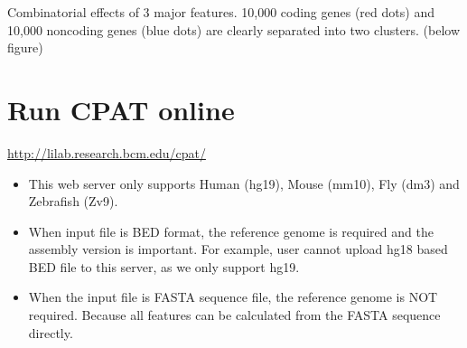 \documentclass[letterpaper,10pt,english]{sphinxmanual}
\begin{document}
Combinatorial effects of 3 major features. 10,000 coding genes (red dots) and 10,000 noncoding genes (blue dots) are clearly separated into two clusters. (below figure)
\begin{figure}[htbp]
\centering

\end{figure}


\chapter{Run CPAT online}
\label{index:run-cpat-online}
\href{http://lilab.research.bcm.edu/cpat/}{http://lilab.research.bcm.edu/cpat/}
\begin{itemize}
\item {} 
This web server only supports Human (hg19), Mouse (mm10), Fly (dm3) and Zebrafish (Zv9).

\item {} 
When input file is BED format, the reference genome is required and the assembly version is important. For example, user cannot upload hg18 based BED file to this server, as we only support hg19.

\item {} 
When the input file is FASTA sequence file, the reference genome is NOT required. Because all features can be calculated from the FASTA sequence directly.

\end{itemize}
\end{document}
